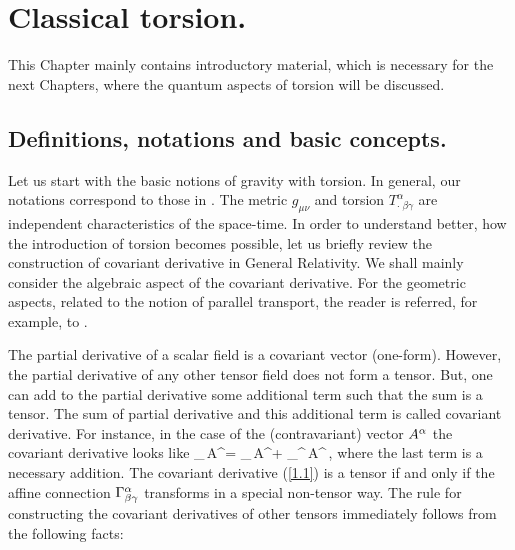 \vskip 10mm

\chapter{Classical torsion.}

This Chapter  mainly contains introductory material,  
which is necessary for the next Chapters, where the quantum aspects
of torsion will be discussed.  

\section{Definitions, notations and basic concepts.}

Let us start with the basic notions of gravity with torsion.
In general, our notations correspond to those in 
\cite{thesis,book}. The metric $g_{\mu\nu}$ and torsion 
$T^\alpha_{\cdot\;\beta\gamma}$ are independent characteristics 
of the space-time. In order to understand
better, how the introduction of torsion becomes possible, let us
briefly review the construction of covariant derivative in 
General Relativity. We shall mainly 
consider the algebraic aspect of the covariant derivative.
For the geometric aspects, related to the notion of 
parallel transport,
the reader is referred, for example, to \cite{hehl}. 

The partial derivative of a scalar field is a covariant vector 
(one-form). However,
the partial derivative of any other tensor field does not form
a tensor. But, one can add to the partial derivative some
additional term such that the sum is a tensor. 
The sum of
partial derivative and this additional term is called covariant
derivative. For instance, in the case of the (contravariant) 
vector $A^\alpha$ the covariant derivative looks like
\beq
\na_\be\,A^\al = \pa_\be\,A^\al + \Gamma_{\be\ga}^\al \,A^\ga\,,
\label{1.1}
\eeq
where the last term is a necessary addition. The covariant 
derivative (\ref{1.1}) is a tensor if and only if the affine 
connection $\Gamma^\alpha_{\beta\gamma}$ transforms in a special non-tensor 
way. The rule for constructing the covariant derivatives of other 
tensors immediately follows from the following facts:

